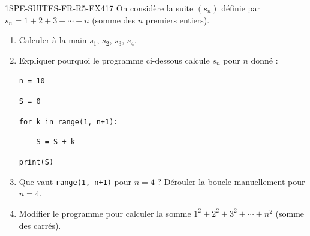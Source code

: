 
\begin{exercice}{1SPE-SUITES-FR-R5-EX4}{1}{7}
On considère la suite $(s_n)$ définie par $s_n = 1 + 2 + 3 + \cdots + n$ (somme des $n$ premiers entiers).

\begin{enumerate}
  \item Calculer à la main $s_1$, $s_2$, $s_3$, $s_4$.
  \item Expliquer pourquoi le programme ci-dessous calcule $s_n$ pour $n$ donné :

\medskip
\verb|n = 10|

\verb|S = 0|

\verb|for k in range(1, n+1):|

\verb|    S = S + k|

\verb|print(S)|

  \item Que vaut \texttt{range(1, n+1)} pour $n = 4$ ? Dérouler la boucle manuellement pour $n = 4$.
  \item Modifier le programme pour calculer la somme $1^2 + 2^2 + 3^2 + \cdots + n^2$ (somme des carrés).
\end{enumerate}
\end{exercice}


